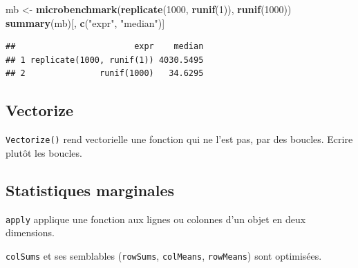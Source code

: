 \documentclass[
  12pt,
  french,
  a4paper,
  extrafontsizes,onecolumn,openright
  ]{memoir}
\newenvironment{Shaded}{\begin{snugshade}}{\end{snugshade}}
\newcommand{\DecValTok}[1]{\textcolor[rgb]{0.00,0.00,0.81}{#1}}
\newcommand{\KeywordTok}[1]{\textcolor[rgb]{0.13,0.29,0.53}{\textbf{#1}}}
\newcommand{\NormalTok}[1]{#1}
\newcommand{\StringTok}[1]{\textcolor[rgb]{0.31,0.60,0.02}{#1}}
\begin{document}
\scriptsize

\begin{Shaded}
\begin{Highlighting}[]
\NormalTok{mb <-}\StringTok{ }\KeywordTok{microbenchmark}\NormalTok{(}\KeywordTok{replicate}\NormalTok{(}\DecValTok{1000}\NormalTok{, }\KeywordTok{runif}\NormalTok{(}\DecValTok{1}\NormalTok{)), }\KeywordTok{runif}\NormalTok{(}\DecValTok{1000}\NormalTok{))}
\KeywordTok{summary}\NormalTok{(mb)[, }\KeywordTok{c}\NormalTok{(}\StringTok{"expr"}\NormalTok{, }\StringTok{"median"}\NormalTok{)]}
\end{Highlighting}
\end{Shaded}

\begin{verbatim}
##                        expr    median
## 1 replicate(1000, runif(1)) 4030.5495
## 2               runif(1000)   34.6295
\end{verbatim}

\normalsize

\hypertarget{vectorize}{%
\subsection{Vectorize}\label{vectorize}}

\texttt{Vectorize()} rend vectorielle une fonction qui ne l'est pas, par des boucles.
Ecrire plutôt les boucles.

\hypertarget{statistiques-marginales}{%
\subsection{Statistiques marginales}\label{statistiques-marginales}}

\texttt{apply} applique une fonction aux lignes ou colonnes d'un objet en deux dimensions.

\texttt{colSums} et ses semblables (\texttt{rowSums}, \texttt{colMeans}, \texttt{rowMeans}) sont optimisées.

\scriptsize
\end{document}
